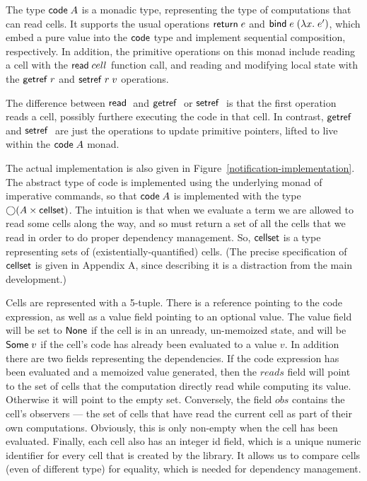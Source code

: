 The type $\mathsf{code}\;{A}$ is a monadic type, representing the type of
computations that can read cells. It supports the usual operations
$\mathsf{return}\; e$ and $\mathsf{bind}\; e\; (\lambda x.\;e')$, which embed a pure value
into the $\mathsf{code}$ type and implement sequential composition,
respectively. In addition, the primitive operations on this monad
include reading a cell with the $\mathsf{read}\; cell$ function call, and
reading and modifying local state with the $\mathsf{getref}\; r$ and $\mathsf{setref}\;
r\;v$ operations.

The difference between $\mathsf{read}\;$ and $\mathsf{getref}\;$ or $\mathsf{setref}\;$ is that
the first operation reads a cell, possibly furthere executing the code
in that cell. In contrast, $\mathsf{getref}\;$ and $\mathsf{setref}\;$ are just the
operations to update primitive pointers, lifted to live within the
$\mathsf{code}\;{A}$ monad.
 
The actual implementation is also given in
Figure~\ref{notification-implementation}. The abstract type of code is
implemented using the underlying monad of imperative commands, so that
$\mathsf{code}\;{A}$ is implemented with the type $\bigcirc{(A \times
  \mathsf{cellset})}$.  The intuition is that when we evaluate a term we are
allowed to read some cells along the way, and so must return a set of
all the cells that we read in order to do proper dependency
management. So, $\mathsf{cellset}$ is a type representing sets of
(existentially-quantified) cells.  (The precise specification of
$\mathsf{cellset}$ is given in Appendix A, since describing it is a
distraction from the main development.)

Cells are represented with a 5-tuple. There is a reference pointing to
the code expression, as well as a value field pointing to an optional
value. The value field will be set to $\mathsf{None}$ if the cell is in
an unready, un-memoized state, and will be $\mathsf{Some}\;v$ if the
cell's code has already been evaluated to a value $v$. In addition there are
two fields representing the dependencies. If the code expression has
been evaluated and a memoized value generated, then the $reads$ field
will point to the set of cells that the computation directly read
while computing its value. Otherwise it will point to the empty
set. Conversely, the field $obs$ contains the cell's observers --- the
set of cells that have read the current cell as part of their own
computations. Obviously, this is only non-empty when the cell has been
evaluated. Finally, each cell also has an integer id field, which is a
unique numeric identifier for every cell that is created by the
library. It allows us to compare cells (even of different type) for
equality, which is needed for dependency management.

